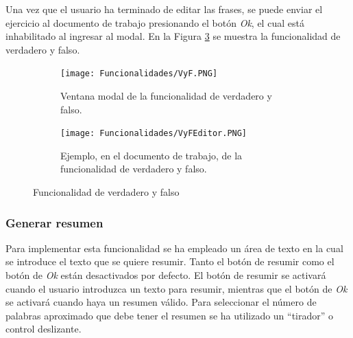 Una vez que el usuario ha terminado de editar las frases, se puede enviar el ejercicio al documento de trabajo presionando el botón \textit{Ok}, el cual está inhabilitado al ingresar al modal. En la Figura \ref{fig:veryfalso} se muestra la funcionalidad de verdadero y falso.

\begin{figure}[ht!]
  \centering
  \begin{subfigure}{\textwidth}
    \centering
    \texttt{[image: Funcionalidades/VyF.PNG]}
    \caption{Ventana modal de la funcionalidad de verdadero y falso.}
    \label{fig:vyf}
  \end{subfigure}
 
  \begin{subfigure}{\textwidth}
    \centering
    \texttt{[image: Funcionalidades/VyFEditor.PNG]}
    \caption{Ejemplo, en el documento de trabajo, de la funcionalidad de verdadero y falso.}
    \label{fig:vyfEdit}
  \end{subfigure}

  \caption{Funcionalidad de verdadero y falso}
  \label{fig:veryfalso}
\end{figure}


\subsubsection{Generar resumen}
\label{sec:impresumen}
Para implementar esta funcionalidad se ha empleado un área de texto en la cual se introduce el texto que se quiere resumir. Tanto el botón de resumir como el botón de \textit{Ok} están desactivados por defecto. El botón de resumir se activará cuando el usuario introduzca un texto para resumir, mientras que el botón de \textit{Ok} se activará cuando haya un resumen válido. Para seleccionar el número de palabras aproximado que debe tener el resumen se ha utilizado un ``tirador'' o control deslizante.

